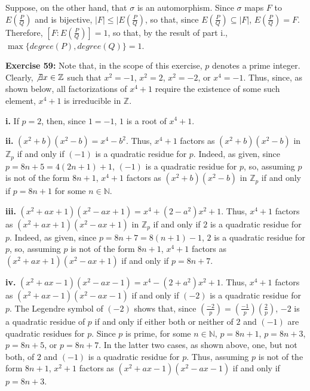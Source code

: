 \documentclass{article}%
\begin{document}
Suppose, on the other hand, that $\sigma$ is an automorphism.
Since $\sigma$ maps $F$ to $E(\frac{P}{Q})$ and is bijective, $|F| \leq
|E(\frac{P}{Q})$, so that, since $E(\frac{P}{Q}) \subseteq |F|$,
$E(\frac{P}{Q}) = F$. Therefore, $[F : E(\frac{P}{Q})] = 1$, so that, by the
result of part i., $\max\{degree(P),degree(Q)\} = 1$.

\textbf{Exercise 59:} Note that, in the scope of this exercise, $p$ denotes
a prime integer. Clearly, $\not \exists x \in \mathbb{Z}$ such that
$x^2 = -1$, $x^2 = 2$, $x^2 = -2$, or $x^4 = -1$. Thus, since, as shown below,
all factorizations of $x^4 + 1$ require the existence of some such element,
$x^4 + 1$ is irreducible in $\mathbb{Z}$.

\textbf{i.} If $p = 2$, then, since $1 = -1$, $1$ is a root of $x^4 + 1$.

\textbf{ii.} $(x^2 + b)(x^2 - b) = x^4 - b^2$. Thus, $x^4 + 1$ factors as
$(x^2 + b)(x^2 - b)$ in $\mathbb{Z}_p$ if and only if $(-1)$ is a quadratic
residue for $p$. Indeed, as
given, since $p = 8n + 5 = 4(2n + 1) + 1$, $(-1)$ is a quadratic residue for
$p$, so, assuming $p$ is not of the form $8n + 1$, $x^4 + 1$ factors as
$(x^2 + b)(x^2 - b)$ in $\mathbb{Z}_p$ if and only if $p = 8n + 1$ for some
$n \in \mathbb{N}$.

\textbf{iii.} $(x^2 + ax + 1)(x^2 - ax + 1) = x^4 + (2 - a^2)x^2 + 1$. Thus,
$x^4 + 1$ factors as $(x^2 + ax + 1)(x^2 - ax + 1)$ in $\mathbb{Z}_p$ if and
only if $2$ is a quadratic residue for $p$. Indeed, as given, since
$p = 8n + 7 = 8(n + 1) - 1$, $2$ is a quadratic residue for $p$, so, assuming
$p$ is not of the form $8n + 1$, $x^4 + 1$ factors as
$(x^2 + ax + 1)(x^2 - ax + 1)$ if and only if $p = 8n + 7$.

\textbf{iv.} $(x^2 + ax - 1)(x^2 - ax - 1) = x^4 - (2 + a^2)x^2 + 1$. Thus,
$x^4 + 1$ factors as $(x^2 + ax - 1)(x^2 - ax - 1)$ if and only if $(-2)$ is a
quadratic residue for $p$. The Legendre symbol of $(-2)$ shows that, since
$\left(\frac{-2}{p}\right) =
    \left(\frac{-1}{p}\right)\left(\frac{2}{p}\right)$,
$-2$ is a quadratic residue of $p$ if and only if either both or neither of $2$ and
$(-1)$ are quadratic residues for $p$. Since $p$ is prime, for some $n \in
\mathbb{N}$, $p = 8n + 1$, $p = 8n + 3$, $p = 8n + 5$, or $p = 8n + 7$. In the
latter two cases, as shown above, one, but not both, of $2$ and $(-1)$ is a quadratic
residue for $p$. Thus, assuming $p$ is not of the form $8n + 1$, $x^2 + 1$
factors as $(x^2 + ax - 1)(x^2 - ax - 1)$ if and only if $p = 8n + 3$.
\end{document}
